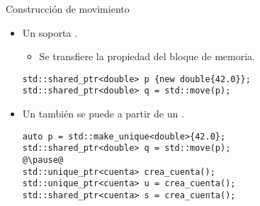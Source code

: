 \begin{frame}[t,fragile]{Construcción de movimiento}
\begin{itemize}
  \item Un  soporta .
    \begin{itemize}
      \item Se transfiere la propiedad del bloque de memoria.
    \end{itemize}
\begin{lstlisting}
std::shared_ptr<double> p {new double{42.0}};
std::shared_ptr<double> q = std::move(p);
\end{lstlisting}

  \item Un  también se puede 
        a partir de un .
\begin{lstlisting}[escapechar=@]
auto p = std::make_unique<double>{42.0};
std::shared_ptr<double> q = std::move(p);
@\pause@
std::unique_ptr<cuenta> crea_cuenta();
std::unique_ptr<cuenta> u = crea_cuenta();
std::shared_ptr<cuenta> s = crea_cuenta();
\end{lstlisting}

\end{itemize}
\end{frame}

